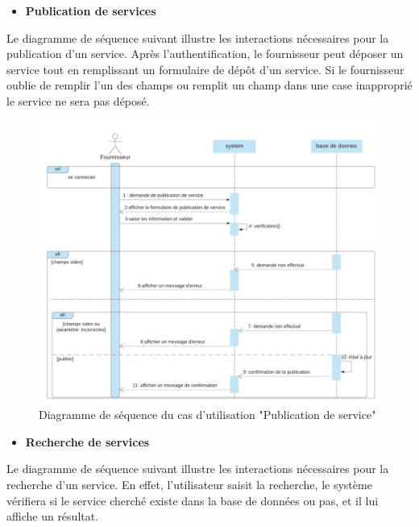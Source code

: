 \documentclass[french]{report}
\begin{document}
\begin{itemize}
\item  \textbf{Publication de services}
\end{itemize}

Le diagramme de séquence suivant illustre les interactions nécessaires pour la
publication d'un  service. Après l'authentification, le fournisseur peut déposer
un service tout en remplissant un formulaire de dépôt d'un service. Si le
fournisseur oublie de remplir l'un des champs ou remplit un champ dans une case
inapproprié le service ne sera pas déposé.

\begin{figure}[H]
    \centering
    \includegraphics[width=1\textwidth]{images/sequence diag publier service.jpg}
    \caption{Diagramme de séquence du cas d'utilisation "Publication de service"}
    \label{fig:my_label}
\end{figure}

\begin{itemize}
    \item \textbf{Recherche de services}
\end{itemize}

Le diagramme de séquence suivant illustre les interactions nécessaires pour la
recherche d'un service. En effet, l'utilisateur saisit la recherche, le système
vérifiera si le service cherché existe dans la base de données ou pas, et il
lui affiche un résultat.
\end{document}
